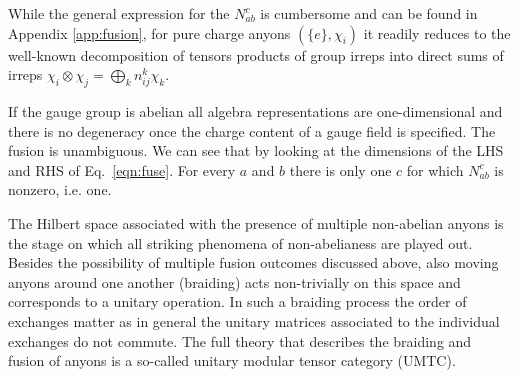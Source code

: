 \documentclass[two column]{article}
\begin{document}
While the general expression for the $N_{ab}^c$ is cumbersome and can be found in Appendix \ref{app:fusion}, for pure charge anyons $(\{e\}, \chi_i)$ it readily reduces to the well-known  decomposition of tensors products of group irreps into direct sums of irreps $\chi_i\otimes\chi_j = \bigoplus_k n^k_{ij} \chi_k$.

If the gauge group is abelian all algebra representations are one-dimensional and there is no degeneracy once the charge content of a gauge field is specified. The fusion is unambiguous. 
We can see that by looking at the dimensions of the LHS and RHS of Eq.~\eqref{eqn:fuse}. For every $a$ and $b$ there is only one $c$ for which $N_{ab}^c$ is nonzero, i.e. one.

The Hilbert space associated with the presence of multiple non-abelian anyons is the stage on which all striking phenomena of non-abelianess are played out. Besides the possibility of multiple fusion outcomes discussed above,  also moving anyons around one another (braiding) acts non-trivially on this space and corresponds to a unitary operation. In such a braiding process the order of exchanges matter as in general the unitary matrices associated to the individual exchanges do not commute. The full theory that describes the braiding and fusion of anyons is a so-called unitary modular tensor category (UMTC)\cite{Kitaev_2003}.
\end{document}
